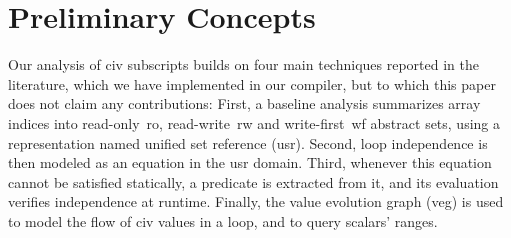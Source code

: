 \documentclass{sig-alternate}
\begin{document}




\section{Preliminary Concepts}
\label{subsec:Background}


Our analysis of {\sc civ} subscripts builds on four main techniques 
reported in the literature, which we have implemented 
in our compiler, but to which this paper does not claim any contributions:
%
First, a baseline analysis summarizes array indices into read-only~{\sc ro}, 
read-write~{\sc rw} and write-first~{\sc wf} abstract sets, using a 
representation named unified set reference ({\sc usr}).
%
Second, loop independence is then modeled as an equation in the 
{\sc usr} domain. 
%
Third, whenever this equation cannot be satisfied statically, a 
predicate is extracted from it, and its evaluation verifies independence 
at runtime. 
%
Finally, the value evolution graph ({\sc veg}) is used to model the 
flow of {\sc civ} values in a loop, and to query scalars' ranges.

\end{document}

